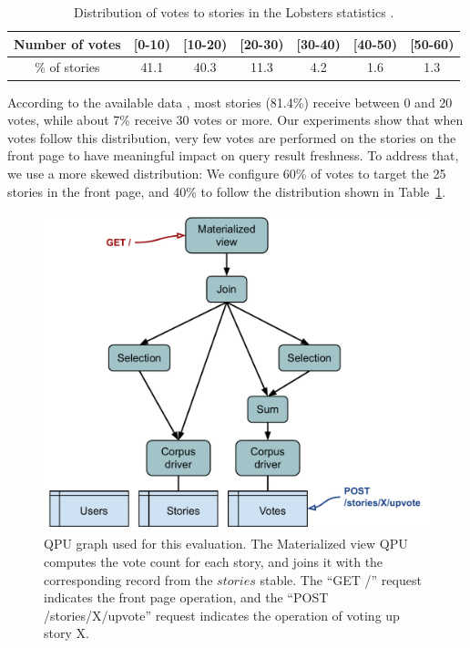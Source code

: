 \begin{table}[H]
\centering
\begin{tabular}{|c||c|c|c|c|c|c|}
\hline
Number of votes & [0-10) & [10-20) & [20-30) & [30-40) & [40-50) & [50-60) \\
\hline
\% of stories & 41.1 & 40.3 & 11.3 & 4.2 & 1.6 & 1.3 \\
\hline
\end{tabular}
\caption{Distribution of votes to stories in the Lobsters statistics \cite{lobste:stats}.}
\label{tab:votes_per_story}
\end{table}

According to the available data \cite{lobste:stats}, most stories (81.4\%) receive between 0 and 20 votes,
while about 7\% receive 30 votes or more.
Our experiments show that when votes follow this distribution,
very few votes are performed on the stories on the front page to have meaningful impact on query result freshness.
To address that, we use a more skewed distribution:
We configure 60\% of votes to target the 25 stories in the front page, and 40\% to follow the distribution shown in Table~\ref{tab:votes_per_story}.

\begin{figure}[H]
  \centering
    \includegraphics[scale=0.5]{./figures/evaluation/lobsters_architecture_eval.pdf}
  \caption{QPU graph used for this evaluation. The Materialized view QPU computes the vote count for each story,
  and joins it with the corresponding record from the $stories$ stable.
  The ``GET /'' request indicates the front page operation, and the ``POST /stories/X/upvote'' request indicates the operation of voting up story X.}
  \label{fig:eval_lobsters_qpu_arch}
\end{figure}

